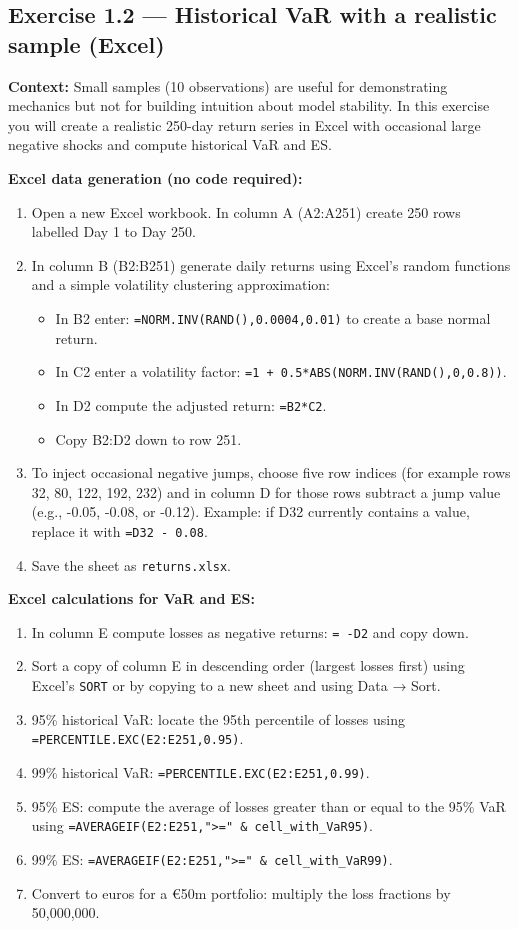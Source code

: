 \documentclass[11pt]{article}
\begin{document}
\bigskip
\subsection*{Exercise 1.2 --- Historical VaR with a realistic sample (Excel)}
\textbf{Context:} Small samples (10 observations) are useful for demonstrating mechanics but not for building intuition about model stability. In this exercise you will create a realistic 250-day return series in Excel with occasional large negative shocks and compute historical VaR and ES.

\textbf{Excel data generation (no code required):}
\begin{enumerate}
  \item Open a new Excel workbook. In column A (A2:A251) create 250 rows labelled Day 1 to Day 250.
  \item In column B (B2:B251) generate daily returns using Excel's random functions and a simple volatility clustering approximation:
    \begin{itemize}
      \item In B2 enter: \texttt{=NORM.INV(RAND(),0.0004,0.01)} to create a base normal return.
      \item In C2 enter a volatility factor: \texttt{=1 + 0.5*ABS(NORM.INV(RAND(),0,0.8))}.
      \item In D2 compute the adjusted return: \texttt{=B2*C2}.
      \item Copy B2:D2 down to row 251.
    \end{itemize}
  \item To inject occasional negative jumps, choose five row indices (for example rows 32, 80, 122, 192, 232) and in column D for those rows subtract a jump value (e.g., -0.05, -0.08, or -0.12). Example: if D32 currently contains a value, replace it with \texttt{=D32 - 0.08}.
  \item Save the sheet as \texttt{returns.xlsx}.
\end{enumerate}

\textbf{Excel calculations for VaR and ES:}
\begin{enumerate}
  \item In column E compute losses as negative returns: \texttt{= -D2} and copy down.
  \item Sort a copy of column E in descending order (largest losses first) using Excel's \texttt{SORT} or by copying to a new sheet and using Data → Sort.
  \item 95\% historical VaR: locate the 95th percentile of losses using \texttt{=PERCENTILE.EXC(E2:E251,0.95)}.
  \item 99\% historical VaR: \texttt{=PERCENTILE.EXC(E2:E251,0.99)}.
  \item 95\% ES: compute the average of losses greater than or equal to the 95\% VaR using \texttt{=AVERAGEIF(E2:E251,">=" & cell_with_VaR95)}.
  \item 99\% ES: \texttt{=AVERAGEIF(E2:E251,">=" & cell_with_VaR99)}.
  \item Convert to euros for a €50m portfolio: multiply the loss fractions by 50,000,000.
\end{enumerate}
\end{document}
